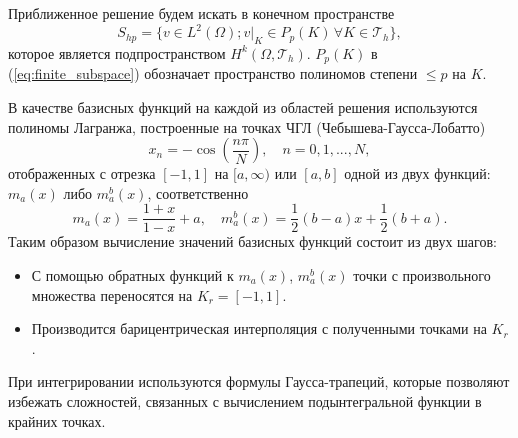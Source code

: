 \documentclass[a4paper,12pt, russian, titlepage]{article} %
\numberwithin{equation}{section}
\numberwithin{theorem}{subsection}
\numberwithin{definition}{subsection}
\numberwithin{proposition}{subsection}
\begin{document}
Приближенное решение будем искать в конечном пространстве
\begin{equation}\label{eq:finite_subspace}
S_{hp} = \{v \in L^2(\Omega); v|_K \in P_p(K)\,  \forall K \in \mathcal{T}_h \},
\end{equation}
которое является подпространством $H^k(\Omega, \mathcal{T}_h)$. $P_p(K)$ в (\ref{eq:finite_subspace}) обозначает пространство полиномов степени $\le p$ на $K$. \par
В качестве базисных функций на каждой из областей решения используются полиномы Лагранжа, построенные на точках ЧГЛ (Чебышева-Гаусса-Лобатто)
\begin{equation}
x_n = - \cos \left(\frac{n \pi}{N}\right), \quad n = 0, 1, ..., N,
\end{equation}
отображенных с отрезка $[-1, 1]$ на $[a, \infty)$ или $[a, b]$ одной из двух функций: $m_a(x)$ либо $m_a^b(x)$, соответственно
\begin{equation}
m_a(x) = \frac{1 + x}{1 - x} + a, \quad m_a^b(x) = \frac{1}{2}(b - a) x + \frac{1}{2}(b + a).
\end{equation}
Таким образом вычисление значений базисных функций состоит из двух шагов:
\begin{itemize}
\item С помощью обратных функций к $m_a(x)$, $m_a^b(x)$ точки с произвольного множества переносятся на $K_r = [-1, 1]$.
\item Производится барицентрическая интерполяция с полученными точками на $K_r$.
\end{itemize}
При интегрировании используются формулы Гаусса-трапеций, которые позволяют избежать сложностей, связанных с вычислением подынтегральной функции в крайних точках.
\end{document}

